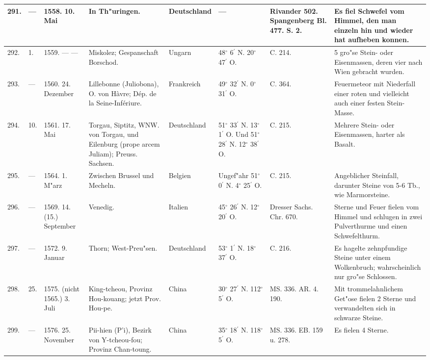 \documentclass[a4paper, 8pt, oneside, polutonikogreek, german]{article}
\begin{document}
\begin{center}
\begin{longtable}{| p{4mm} | p{2mm} | p{15mm} | p{25mm} | p{16mm} | p{12mm} | p{13mm} | p{20mm} |}
        291. & --- & 1558. 10. Mai & In Th"uringen. & Deutschland & --- & Rivander 502. Spangenberg Bl. 477. S. 2. & Es fiel Schwefel vom Himmel, den man einzeln hin und wieder hat aufheben konnen. \\ \hline
        292. & 1. & 1559. --- --- & Miskolez; Gespanschaft Borschod. & Ungarn & 48$^\circ$ 6$^\prime$ N. 20$^\circ$ 47$^\prime$ O. & C. 214. & 5 gro"se Stein- oder Eisenmassen, deren vier nach Wien gebracht wurden. \\ \hline
        293. & --- & 1560. 24. Dezember & Lillebonne (Juliobona), O. von Hàvre; Dép. de la Seine-Infériure. & Frankreich & 49$^\circ$ 32$^\prime$ N. 0$^\circ$ 31$^\prime$ O. & C. 364. & Feuermeteor mit Niederfall einer roten und vielleicht auch einer festen Stein-Masse. \\ \hline
        294. & 10. & 1561. 17. Mai & Torgau, Siptitz, WNW. von Torgau, und Eilenburg (prope arcem Juliam); Preuss. Sachsen. & Deutschland & 51$^\circ$ 33$^\prime$ N. 13$^\circ$ 1$^\prime$ O. Und 51$^\circ$ 28$^\prime$ N. 12$^\circ$ 38$^\prime$ O. & C. 215. & Mehrere Stein- oder Eisenmassen, harter als Basalt. \\ \hline
        295. & --- & 1564. 1. M"arz & Zwischen Brussel und Mecheln. & Belgien & Ungef"ahr 51$^\circ$ 0$^\prime$ N. 4$^\circ$ 25$^\prime$ O. & C. 215. & Angeblicher Steinfall, darunter Steine von 5-6 Tb., wie Marmorsteine. \\ \hline
        296. & --- & 1569. 14. (15.) September & Venedig. & Italien & 45$^\circ$ 26$^\prime$ N. 12$^\circ$ 20$^\prime$ O. & Dresser Sachs. Chr. 670. & Sterne und Feuer fielen vom Himmel und schlugen in zwei Pulverthurme und einen Schwefelthurm. \\ \hline
        297. & --- & 1572. 9. Januar & Thorn; West-Preu"sen. & Deutschland & 53$^\circ$ 1$^\prime$ N. 18$^\circ$ 37$^\prime$ O. & C. 216. & Es hagelte zehnpfundige Steine unter einem Wolkenbruch; wahrscheinlich nur gro"se Schlossen. \\ \hline
        298. & 25. & 1575. (nicht 1565.) 3. Juli & King-tcheou, Provinz Hou-kouang; jetzt Prov. Hou-pe. & China & 30$^\circ$ 27$^\prime$ N. 112$^\circ$ 5$^\prime$ O. & MS. 336. AR. 4. 190. & Mit trommelahnlichem Get"ose fielen 2 Sterne und verwandelten sich in schwarze Steine. \\ \hline
        299. & --- & 1576. 25. November & Pii-hien (P’i), Bezirk von Y-tcheou-fou; Provinz Chan-toung. & China & 35$^\circ$ 18$^\prime$ N. 118$^\circ$ 5$^\prime$ O. & MS. 336. EB. 159 u. 278. & Es fielen 4 Sterne. \\ \hline

\end{longtable}
\end{center}
\end{document}

